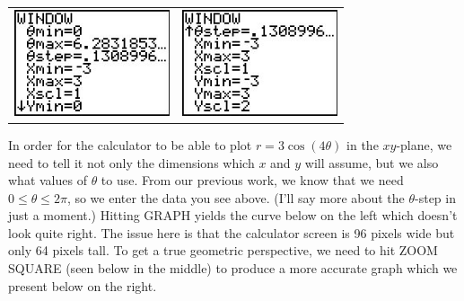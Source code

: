 \documentclass{ximera}
\begin{document}
\begin{center}

\begin{tabular}{cc}

\includegraphics[width=1.8in]{./PolarGraphsGraphics/Polar04.jpg} &
\hspace{0.75in} \includegraphics[width=1.8in]{./PolarGraphsGraphics/Polar05.jpg}\\

\end{tabular} 

\end{center}

In order for the calculator to be able to plot $r = 3\cos(4\theta)$ in the $xy$-plane, we need to tell it not only the dimensions which $x$ and $y$ will assume, but we also what values of $\theta$ to use.  From our previous work, we know that we need $0 \leq \theta \leq 2\pi$, so we enter the data you see above.  (I'll say more about the $\theta$-step in just a moment.)  Hitting GRAPH yields the curve below on the left which doesn't look quite right.  The issue here is that the calculator screen is 96 pixels wide but only 64 pixels tall.  To get a true geometric perspective, we need to hit ZOOM SQUARE (seen below in the middle) to produce a more accurate graph which we present below on the right.  
\end{document}
